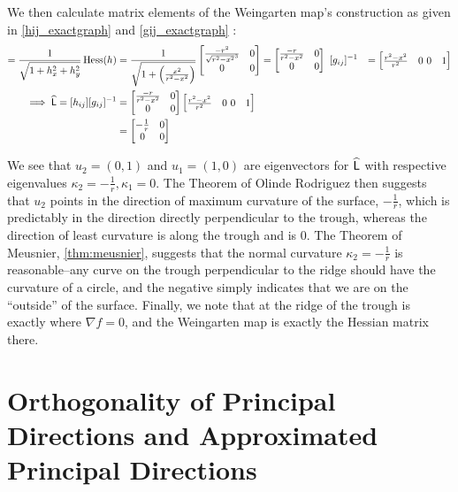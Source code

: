   We then calculate matrix elements of the Weingarten map's construction as given in
  \cref{hij_exactgraph} and \cref{gij_exactgraph} :
  \begin{align}
  [h_{ij}] = \frac{1}{\sqrt{1+h_x^2 + h_y^2}} \,  \Hess (h)
     &= \frac{1}{\sqrt{1+\left(\frac{x^2}{r^2-x^2}\right)}}
     \begin{bmatrix}
     \frac{-r^2}{\sqrt{r^2 - x^2}^3} & 0 \\
    0 & 0
     \end{bmatrix} 
     = \begin{bmatrix}
     \frac{-r}{r^2 - x^2} & 0 \\
     0 & 0
     \end{bmatrix} \
     [g_{ij}]^{-1} &= \begin{bmatrix} \frac{r^2 - x^2}{r^2} & 0 \ 0 & 1 \end{bmatrix} \\
     \implies \weinmat = [h_{ij}]	[g_{ij}]^{-1} &=
     \begin{bmatrix}
     \frac{-r}{r^2 - x^2} & 0 \\
     0 & 0
     \end{bmatrix} \begin{bmatrix} \frac{r^2 - x^2}{r^2} & 0 \ 0 & 1 \end{bmatrix} \\
     &= \begin{bmatrix} - \frac{1}{r} & 0 \\ 0 & 0 	\end{bmatrix}	       	
  \end{align}
  
  We see that $u_2 = (0,1)$ and $u_1 = (1,0)$ are eigenvectors for $\widehat{\mathsf{L}}$ with respective eigenvalues
  $\kappa_2 = -\frac{1}{r} , \kappa_1 = 0$. The Theorem of Olinde Rodriguez then suggests that $u_2$ points in the direction of maximum curvature of the surface, $-\frac{1}{r}$, which is predictably in the direction directly perpendicular to the trough, whereas the direction of least curvature is along the trough and is $0$. The Theorem of Meusnier, \cref{thm:meusnier}, suggests that the normal curvature $\kappa_2 = -\frac{1}{r}$ is reasonable--any curve on the trough perpendicular to the ridge should have the curvature of a circle, and the negative simply indicates that we are on the ``outside'' of the surface. Finally, we note that at the ridge of the trough is exactly where $\nabla f = 0$, and the Weingarten map is exactly the Hessian matrix there.
  

  \section{Orthogonality of Principal Directions and Approximated Principal Directions}
    
